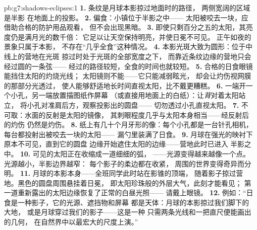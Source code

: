 \begin{solution}{pb:g7:shadows-eclipses:1}
\textbf{1.} 条纹是月球本影掠过地面时的路径，
两侧宽阔的区域是半影
在地面上的投影。
\textbf{2.} 偏食：小镇位于半影之中——
太阳被咬去一块，应借助合格的防护用品观看，
但不会出现黑暗。
\textbf{3.} 即使只剩百分之五的太阳，其亮度仍是满月光的数千倍：
它足以让天空保持明亮，并使日冕不可见。
正午如夜的景象只属于本影，
不存在“几乎全食”这种情况。
\textbf{4.} 本影光斑大致为圆形：位于中线上的营地在光斑
掠过时处于光斑的全部宽度之下，
而靠近条纹边缘的营地只会经过圆的一条弦——
经过的路径较短，全食的时间也就较短。
\textbf{5.} 合格的日食眼镜能挡住太阳的灼烧光线；
太阳镜则不能——它只能减弱眩光，
却会让灼伤视网膜的那部分光透过，
使人能够舒适地长时间直视太阳，比不戴更糟糕。
\textbf{6.} 一端开一个小孔，另一端放置描图纸作屏幕
（或直接用地面上的白纸）：让\emph{背}对着太阳站立，
将小孔对准肩后方，观察投影出的圆盘——
切勿透过小孔直视太阳。
\textbf{7.} 不可取：水面的反射是太阳的镜像，
其刺眼程度几乎与太阳本身相当——经反射后的灼伤
仍然是灼伤。
\textbf{8.} 纸上有几十个月牙形的像：每个小孔都是一台针孔相机，
每台都投射出被咬去一块的太阳——
漏勺里装满了日食。
\textbf{9.} 月球在强光的映衬下原本不可见，直到它的圆盘
边缘开始遮住太阳的边缘——营地此时已进入
半影之中。
\textbf{10.} 可见的太阳正在收缩成一道细细的弧，
——光源变得越来越像一个点。光源越小，半影边界越窄：
每个影子的柔边都在收紧，
周围的世界变得奇异而分明。
\textbf{11.} 月球的本影本身——全班同学此时站在影锥的顶端，
随着影子掠过营地。黑色的圆盘周围悬挂着日冕，
即太阳珍珠般的外层大气，此刻才能看见；
第一道重新露出的太阳边缘恢复了正常的白昼光照——
请戴上眼镜。
\textbf{12.} 例如：“日食是一种影子，它的光源、遮挡物和屏幕
都是天体：月球的本影掠过我们脚下的大地，
或是月球穿过我们的影子——这是一种
只需两条光线和一把直尺便能画出的几何，
在自然界中以最宏大的尺度上演。”
\end{solution}
